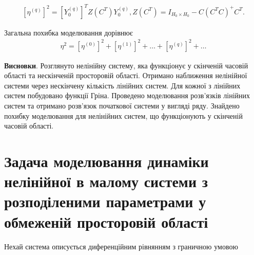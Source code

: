 \begin{gather*}
    \left[ \eta^{(q)} \right]^{2} = \left[ Y_{0}^{(q)} \right]^{T}Z\left( C^{T} \right)Y_{0}^{(q)},
    Z\left( C^{T} \right)=I_{H_{0}\times H_{0}} - C\left( C^{T} C\right)^{+}C^{T}.
\end{gather*}

Загальна похибка моделювання дорівнює
\begin{gather*}
    \eta^{2} = \left[ \eta^{(0)} \right]^{2} + \left[ \eta^{(1)} \right]^{2} + \dots + \left[ \eta^{(q)} \right]^{2} + \dots
\end{gather*}

\textbf{Висновки}.
Розглянуто нелінійну систему, яка функціонує у скінченій часовій області та нескінченій
просторовій області.
Отримано наближення нелінійної системи через нескінчену кількість лінійних систем.
Для кожної з лінійних систем побудовано функції Гріна.
Проведено моделювання розв'язків лінійних систем та отримано розв'язок початкової системи у вигляді ряду.
Знайдено похибку моделювання для нелінійних систем, що функціонують у скінченій часовій області.

\section{Задача моделювання динаміки нелінійної в малому системи з розподіленими параметрами у обмеженій
просторовій області} \label{sec:sect2_3}

Нехай система описується диференційним рівнянням з граничною умовою

